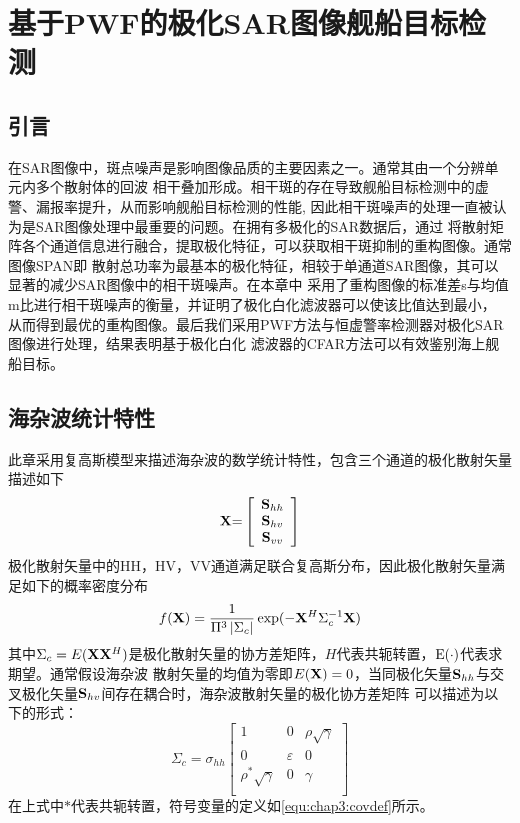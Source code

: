 \chapter{基于PWF的极化SAR图像舰船目标检测}
\label{cha:PWF}

\section{引言}
\label{sec:intro}
在SAR图像中，斑点噪声是影响图像品质的主要因素之一。通常其由一个分辨单元内多个散射体的回波
相干叠加形成。相干斑的存在导致舰船目标检测中的虚警、漏报率提升，从而影响舰船目标检测的性能,
因此相干斑噪声的处理一直被认为是SAR图像处理中最重要的问题。在拥有多极化的SAR数据后，通过
将散射矩阵各个通道信息进行融合，提取极化特征，可以获取相干斑抑制的重构图像。通常图像SPAN即
散射总功率为最基本的极化特征，相较于单通道SAR图像，其可以显著的减少SAR图像中的相干斑噪声。在本章中
采用了重构图像的标准差s与均值m比进行相干斑噪声的衡量，并证明了极化白化滤波器可以使该比值达到最小，
从而得到最优的重构图像。最后我们采用PWF方法与恒虚警率检测器对极化SAR图像进行处理，结果表明基于极化白化
滤波器的CFAR方法可以有效鉴别海上舰船目标。

\section{海杂波统计特性}
    此章采用复高斯模型来描述海杂波的数学统计特性，包含三个通道的极化散射矢量描述如下
    \begin{equation}
      {\bf{X}}{\rm{ = }}\left[ {\begin{array}{*{20}{c}}
        {{{\bf{S}}_{hh}}} \\
        {{{\bf{S}}_{hv}}} \\
        {{{\bf{S}}_{vv}}} 
        \end{array}} \right]   
    \end{equation}
    极化散射矢量中的HH，HV，VV通道满足联合复高斯分布，因此极化散射矢量满足如下的概率密度分布
    \begin{equation}
        f({\bf{X}}) = \frac{1}{{{\Pi ^3}\left| {{\Sigma _c}} \right|}}\exp ( - {{\bf{X}}^H}\Sigma _c^{ - 1}{\bf{X}})
    \end{equation}
    其中${{\Sigma _c}}=E({\bf{X}}{{\bf{X}}^H})$是极化散射矢量的协方差矩阵，$H$代表共轭转置，${\rm{E}}( \cdot )$代表求期望。通常假设海杂波
    散射矢量的均值为零即$E({\bf{X}})=0$，当同极化矢量$ {{{\bf{S}}_{hh}}}$与交叉极化矢量${{{\bf{S}}_{hv}}}$间存在耦合时，海杂波散射矢量的极化协方差矩阵
    可以描述为以下的形式：
    \begin{equation}
        {\Sigma _c} = {\sigma _{hh}}\left[ {\begin{matrix}
   1 & 0 & {\rho \sqrt \gamma  }  \\ 
   0 & \varepsilon  & 0  \\ 
   {{\rho ^*}\sqrt \gamma  } & 0 & \gamma   \\ 
   \end{matrix}} \right]
    \end{equation}
    在上式中$*$代表共轭转置，符号变量的定义如\ref{equ:chap3:covdef}所示。

